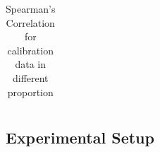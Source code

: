 \documentclass[11pt]{article}
\begin{document}
\begin{table}[t]
\begin{center}
\begin{tabular}{|c|c|c|c|c|c|c|}
\end{tabular}
\end{center}
\caption{\label{firstkbleu} Spearman's Correlation for calibration data in different proportion}
\end{table}




%






    
%
%
%
\subsection{Experimental Setup}
\end{document}
